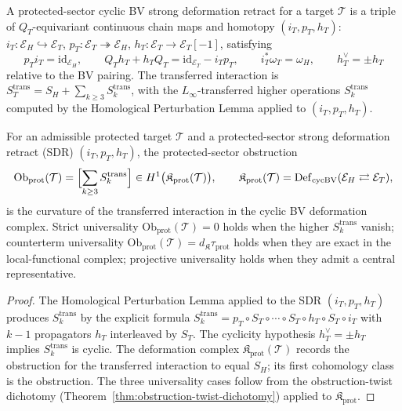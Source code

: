 \begin{defn}
\label{def:completion-protected-sector-sdr}
A protected-sector cyclic BV strong deformation retract for a
target \(\mathcal T\) is a triple of \(Q_T\)-equivariant continuous
chain maps and homotopy
\((i_T,p_T,h_T)\):
\(i_T:\mathcal E_H\hookrightarrow\mathcal E_T\),
\(p_T:\mathcal E_T\twoheadrightarrow\mathcal E_H\),
\(h_T:\mathcal E_T\to\mathcal E_T[-1]\), satisfying
\[
  p_Ti_T=\mathrm{id}_{\mathcal E_H},
  \qquad
  Q_Th_T+h_TQ_T=\mathrm{id}_{\mathcal E_T}-i_Tp_T,
  \qquad
  i_T^*\omega_T=\omega_H,
  \qquad
  h_T^\vee=\pm h_T
\]
relative to the BV pairing.  The transferred interaction is
\(S_T^{\mathrm{trans}}=S_H+\sum_{k\ge 3}S^{\mathrm{trans}}_k\), with
the \(L_\infty\)-transferred higher operations
\(S^{\mathrm{trans}}_k\) computed by the Homological Perturbation
Lemma applied to \((i_T,p_T,h_T)\).
\end{defn}

\begin{thm}
\label{thm:completion-prot-sector-obstruction}
For an admissible protected target \(\mathcal T\) and a
protected-sector strong deformation retract (SDR) \((i_T,p_T,h_T)\),
the protected-sector obstruction
\[
  \mathrm{Ob}_{\mathrm{prot}}(\mathcal T)
  =\Bigl[\sum_{k\ge 3}S^{\mathrm{trans}}_k\Bigr]
  \in H^1\bigl(\mathfrak K_{\mathrm{prot}}(\mathcal T)\bigr),
  \qquad
  \mathfrak K_{\mathrm{prot}}(\mathcal T)
  =\mathrm{Def}_{\mathrm{cycBV}}(\mathcal E_H\rightleftarrows\mathcal E_T),
\]
is the curvature of the transferred interaction in the cyclic BV
deformation complex.  Strict universality
\(\mathrm{Ob}_{\mathrm{prot}}(\mathcal T)=0\) holds when the higher
\(S^{\mathrm{trans}}_k\) vanish; counterterm universality
\(\mathrm{Ob}_{\mathrm{prot}}(\mathcal T)=d_{\mathfrak K}\tau_{\mathrm{prot}}\)
holds when they are exact in the local-functional complex; projective
universality holds when they admit a central representative.
\end{thm}

\begin{proof}
The Homological Perturbation Lemma
\cite{crainic-perturbation-lemma}\cite{brown-perturbation-lemma} applied
to the SDR \((i_T,p_T,h_T)\) produces \(S^{\mathrm{trans}}_k\) by
the explicit formula
\(S^{\mathrm{trans}}_k=p_T\circ S_T\circ\cdots\circ S_T\circ h_T\circ S_T\circ i_T\)
with \(k-1\) propagators \(h_T\) interleaved by \(S_T\).  The
cyclicity hypothesis \(h_T^\vee=\pm h_T\) implies
\(S^{\mathrm{trans}}_k\) is cyclic.  The deformation complex
\(\mathfrak K_{\mathrm{prot}}(\mathcal T)\) records the obstruction for
the transferred interaction to equal \(S_H\); its first cohomology
class is the obstruction.  The three universality cases follow
from the obstruction-twist dichotomy
(Theorem~\ref{thm:obstruction-twist-dichotomy}) applied to
\(\mathfrak K_{\mathrm{prot}}\).
\end{proof}

